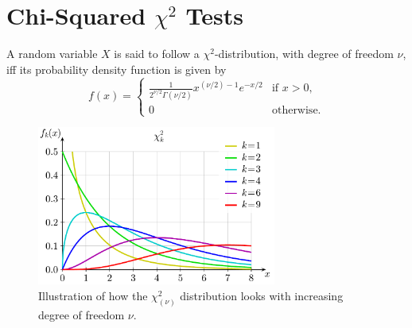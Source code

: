 \documentclass[../Notes.tex]{subfiles}
\begin{document}
\chapter{Chi-Squared \(\chi^2\) Tests}
\begin{definition}{}{}
  A random variable \(X\) is said to follow a \(\chi^2\)-distribution, with degree of freedom \(\nu\), iff its probability density function is given by
  \[f(x)=\begin{cases}
    \frac{1}{2^{\nu/2}\Gamma(\nu/2)}x^{(\nu/2)-1}e^{-x/2} &\text{if \(x>0\)},\\
    0 &\text{otherwise}.
  \end{cases}\]
\end{definition}
\begin{figure}[H]
  \centering
  \includegraphics[width=0.7\textwidth]{../Diagrams/Chi-square.pdf}
  \caption{Illustration of how the \(\chi_{(\nu)}^2\) distribution looks with increasing degree of freedom \(\nu\).}
  \label{fig:chi-square}
\end{figure}
\end{document}
